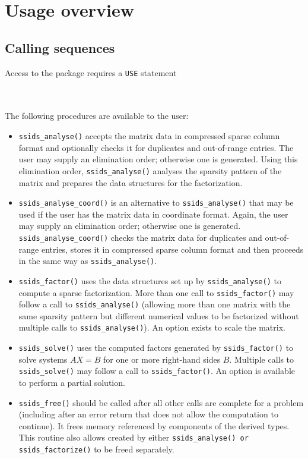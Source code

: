 
\section{Usage overview}

\subsection{Calling sequences}

Access to the package requires a {\tt USE} statement \\ \\
\indent\hspace{8mm}{\tt use spral\_ssids} \\

\medskip

\noindent
The following procedures are available to the user:
\begin{itemize}
\item {\tt ssids\_analyse()} accepts the matrix data in compressed
sparse column format and optionally checks it for duplicates and  out-of-range entries.
The user may supply an elimination order; otherwise
one is generated. Using this elimination order,
{\tt ssids\_analyse()} analyses the sparsity pattern of
the matrix and prepares the data structures for the factorization.

 \item {\tt ssids\_analyse\_coord()} is an alternative to
{\tt ssids\_analyse()} that may be used if the user has
the matrix data in coordinate
format. Again, the user may supply an elimination order; otherwise
one is generated. {\tt ssids\_analyse\_coord()}
checks the matrix data  for duplicates and  out-of-range entries,
stores
it in compressed sparse column format and then proceeds
in the same way as {\tt ssids\_analyse()}.

\item {\tt ssids\_factor()} uses the data structures
set up by {\tt ssids\_analyse()} to compute a sparse
factorization. More than one call to  {\tt ssids\_factor()}
may follow a call to {\tt ssids\_analyse()} (allowing more than
one matrix with the same sparsity pattern but different
numerical values to be factorized without multiple calls to
{\tt ssids\_analyse()}).
An option exists to scale the matrix.

\item {\tt ssids\_solve()} uses the computed factors generated
by  {\tt ssids\_factor()}
to solve systems ${AX= B}$
for one or more right-hand sides $B$.
Multiple calls to {\tt ssids\_solve()} may follow a call to
{\tt ssids\_factor()}.
An option is available to perform a partial solution.

\item {\tt ssids\_free()} should be called after all other calls
are complete for a problem (including after an error
return that does not allow the computation
to continue). It frees memory referenced by components of
the derived types. This routine also allows created by either
{\tt ssids\_analyse() or ssids\_factorize()} to be freed separately.
\end{itemize}

